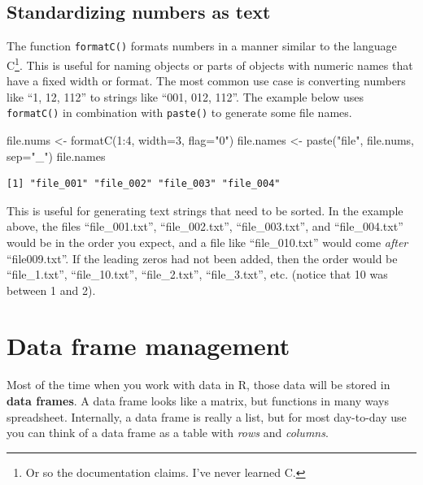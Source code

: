\documentclass[
  13,
  letterpaper,
]{report}
\newenvironment{Shaded}{\begin{snugshade}}{\end{snugshade}}
\newcommand{\AttributeTok}[1]{\textcolor[rgb]{0.40,0.45,0.13}{#1}}
\newcommand{\DecValTok}[1]{\textcolor[rgb]{0.68,0.00,0.00}{#1}}
\newcommand{\FunctionTok}[1]{\textcolor[rgb]{0.28,0.35,0.67}{#1}}
\newcommand{\NormalTok}[1]{\textcolor[rgb]{0.00,0.23,0.31}{#1}}
\newcommand{\OtherTok}[1]{\textcolor[rgb]{0.00,0.23,0.31}{#1}}
\newcommand{\SpecialCharTok}[1]{\textcolor[rgb]{0.37,0.37,0.37}{#1}}
\newcommand{\StringTok}[1]{\textcolor[rgb]{0.13,0.47,0.30}{#1}}
\begin{document}
\subsection{Standardizing numbers as text}\label{sec-manip-char-stan}

The function \texttt{formatC()} formats numbers in a manner similar to
the language C\footnote{Or so the documentation claims. I've never
  learned C.}. This is useful for naming objects or parts of objects
with numeric names that have a fixed width or format. The most common
use case is converting numbers like ``1, 12, 112'' to strings like
``001, 012, 112''. The example below uses \texttt{formatC()} in
combination with \texttt{paste()} to generate some file names.

\begin{Shaded}
\begin{Highlighting}[]
\NormalTok{file.nums }\OtherTok{\textless{}{-}} \FunctionTok{formatC}\NormalTok{(}\DecValTok{1}\SpecialCharTok{:}\DecValTok{4}\NormalTok{, }\AttributeTok{width=}\DecValTok{3}\NormalTok{, }\AttributeTok{flag=}\StringTok{"0"}\NormalTok{)}
\NormalTok{file.names }\OtherTok{\textless{}{-}} \FunctionTok{paste}\NormalTok{(}\StringTok{"file"}\NormalTok{, file.nums, }\AttributeTok{sep=}\StringTok{"\_"}\NormalTok{)}
\NormalTok{file.names}
\end{Highlighting}
\end{Shaded}

\begin{verbatim}
[1] "file_001" "file_002" "file_003" "file_004"
\end{verbatim}

This is useful for generating text strings that need to be sorted. In
the example above, the files ``file\_001.txt'', ``file\_002.txt'',
``file\_003.txt'', and ``file\_004.txt'' would be in the order you
expect, and a file like ``file\_010.txt'' would come \emph{after}
``file009.txt''. If the leading zeros had not been added, then the order
would be ``file\_1.txt'', ``file\_10.txt'', ``file\_2.txt'',
``file\_3.txt'', etc. (notice that 10 was between 1 and 2).

\section{Data frame management}\label{sec-manip-df}

Most of the time when you work with data in R, those data will be stored
in \textbf{data frames}. A data frame looks like a matrix, but functions
in many ways spreadsheet. Internally, a data frame is really a list, but
for most day-to-day use you can think of a data frame as a table with
\emph{rows} and \emph{columns}.
\end{document}
